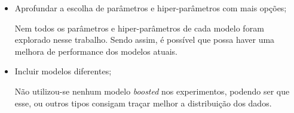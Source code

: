 \begin{itemize}
    \item Aprofundar a escolha de parâmetros e hiper-parâmetros com mais opções;
    
    Nem todos os parâmetros e hiper-parâmetros de cada modelo foram explorado nesse trabalho. Sendo assim, é possível que possa haver uma melhora de performance dos modelos atuais.
    
    \item Incluir modelos diferentes;
    
    Não utilizou-se nenhum modelo \textit{boosted} nos experimentos, podendo ser que esse, ou outros tipos consigam traçar melhor a distribuição dos dados.
    
\end{itemize}

